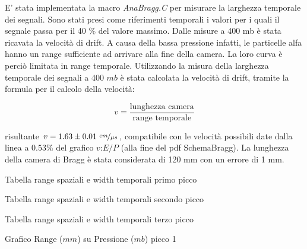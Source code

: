 E' stata implementata la macro \textit{AnaBragg.C} per misurare la larghezza temporale dei segnali. Sono stati presi come riferimenti temporali i valori per i quali il segnale
passa per il 40 \% del valore massimo. 
Dalle misure a 400 mb è stata ricavata la velocità di drift. A causa della bassa pressione infatti, le particelle alfa hanno un range sufficiente ad arrivare alla fine della camera. La loro curva è perciò limitata in range temporale. 
Utilizzando la misura della larghezza temporale dei segnali a 400 $mb$ è stata calcolata la velocità di drift, 
tramite la formula per il calcolo della velocità:

$$ v=\frac{\textrm{lunghezza camera}}{\textrm{range temporale}} $$

risultante $v = 1.63 \pm 0.01 \ \nicefrac{cm}{\mu s}$, compatibile con le velocità possibili date dalla linea a $0.53\%$ del grafico $v$:$E/P$ (alla fine del pdf SchemaBragg). La lunghezza della camera di Bragg è stata considerata di 120 mm con un errore di 1 mm.

\begin{tabella}
 \centering
  
 \caption{Tabella range spaziali e width temporali primo picco}
 \label{tab:range_picco1.tex}
\end{tabella}

\begin{tabella}
 \centering
  
 \caption{Tabella range spaziali e width temporali secondo picco}
 \label{tab:range_picco2.tex}
\end{tabella}

\begin{tabella}
 \centering
  
 \caption{Tabella range spaziali e width temporali terzo picco}
 \label{tab:range_picco3.tex}
\end{tabella}



\begin{grafico}
 \centering
 \caption{Grafico Range ($mm$) su Pressione ($mb$) picco 1} 
 \label{gr:rangepicco1.tex} 
\end{grafico}


